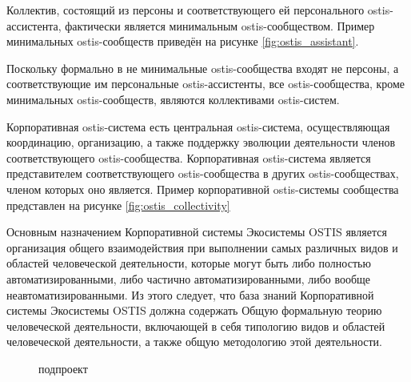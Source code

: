 Коллектив, состоящий из персоны и соответствующего ей персонального ostis-ассистента, фактически является минимальным ostis-сообществом.
Пример минимальных ostis-сообществ приведён на рисунке \ref{fig:ostis_assistant}.


Поскольку формально в не минимальные ostis-сообщества входят не персоны, а соответствующие им персональные ostis-ассистенты, все ostis-сообщества, кроме минимальных ostis-сообществ, являются коллективами ostis-систем.

Корпоративная ostis-система есть центральная ostis-система, осуществляющая координацию, организацию, а также поддержку эволюции деятельности членов соответствующего ostis-сообщества. 
Корпоративная ostis-система является представителем соответствующего ostis-сообщества в других ostis-сообществах, членом которых оно является.
Пример корпоративной ostis-системы сообщества представлен на рисунке \ref{fig:ostis_collectivity}


Основным назначением Корпоративной системы Экосистемы OSTIS является организация общего взаимодействия при выполнении самых различных видов и областей человеческой деятельности, которые могут быть либо полностью автоматизированными, либо частично автоматизированными, либо вообще неавтоматизированными. 
Из этого следует, что база знаний Корпоративной системы Экосистемы OSTIS должна содержать Общую формальную теорию человеческой деятельности, включающей в себя типологию видов и областей человеческой деятельности, а также общую методологию этой деятельности.

\begin{figure}[htbp]
\begin{SCn}
\begin{scnrelfromlist}{подпроект}
\end{scnrelfromlist}
\end{SCn}
\end{figure}

